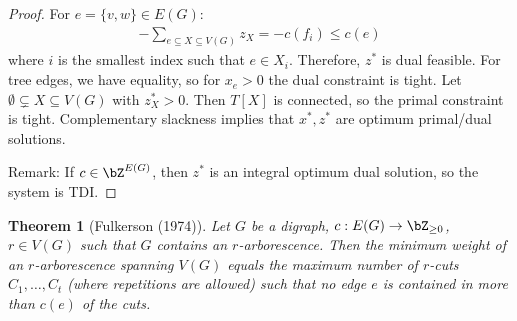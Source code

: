 \documentclass[11pt, a4paper]{article}
\newcommand{\set}[1]{\{#1\}}
\newtheorem{theorem}{Theorem}[section]
\theoremstyle{remark}
\theoremstyle{definition}
\begin{document}
\begin{proof}
	For $e=\set{v,w}\in E(G)$:
	\begin{align*}
		-\sum_{e\subseteq X\subseteq V(G)}z_X=-c(f_i)\leq c(e)
	\end{align*}
	where $i$ is the smallest index such that $e\in X_i$. Therefore, $z^*$
	is dual feasible. For tree edges, we have equality, so for $x_e>0$ the
	dual constraint is tight. Let $\emptyset\subsetneq X\subseteq V(G)$
	with $z^*_X>0$. Then $T[X]$ is connected, so the primal constraint is
	tight. Complementary slackness implies that $x^*,z^*$ are optimum
	primal/dual solutions.

	Remark: If $c\in\bZ^{E(G)}$, then $z^*$ is an integral optimum dual
	solution, so the system is TDI.
\end{proof}

\begin{theorem}[Fulkerson (1974)]
	Let $G$ be a digraph, $c: E(G)\to\bZ_{\geq0}$, $r\in V(G)$ such that
	$G$ contains an $r$-arborescence. Then the minimum weight of an $r$-arborescence
	spanning $V(G)$ equals the maximum number of $r$-cuts $C_1,\ldots,C_t$
	(where repetitions are allowed) such that no edge $e$ is contained in more
	than $c(e)$ of the cuts.
\end{theorem}
\end{document}
